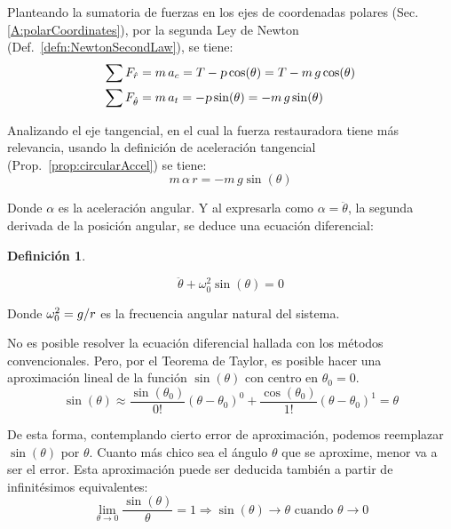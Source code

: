 \documentclass[a5paper,12pt,twoside]{book}
\newtheorem{defn}{{Definición}}[chapter]
\begin{document}
\begin{center}
    \def\svgwidth{\linewidth}
    
\end{center}

Planteando la sumatoria de fuerzas en los ejes de coordenadas polares (Sec. \ref{A:polarCoordinates}), por la segunda Ley de Newton (Def.\ \ref{defn:NewtonSecondLaw}), se tiene:
\begin{align*}
    \sum F_{\hat{r}} &= m \, a_c = T - \textsl{p} \cos(\theta) = T - m \, g \cos(\theta)
    \\
    \sum F_{\hat{\theta}} &= m \, a_t = - \textsl{p} \sin(\theta) = - m \, g \sin(\theta)
\end{align*}

Analizando el eje tangencial, en el cual la fuerza restauradora tiene más relevancia, usando la definición de aceleración tangencial (Prop.\ \ref{prop:circularAccel}) se tiene:
\[ m \, \alpha \, r = - m \, g \sin(\theta) \]

Donde $\alpha$ es la aceleración angular. Y al expresarla como $\alpha = \ddot{\theta}$, la segunda derivada de la posición angular, se deduce una ecuación diferencial:

\begin{mdframed}[style=MyFrame1]
    \begin{defn}
    \end{defn}
    \begin{equation*}
        \ddot{\theta} + \omega_0^2 \sin(\theta) = 0
    \end{equation*}
\end{mdframed}

Donde $\omega_0^2=g/r$ es la frecuencia angular natural del sistema.

No es posible resolver la ecuación diferencial hallada con los métodos convencionales. Pero, por el Teorema de Taylor, es posible hacer una aproximación lineal de la función $\sin{(\theta)}$ con centro en $\theta_0 = 0$.
\[
  \sin(\theta) \approx \frac{\sin(\theta_0)}{0!} \left( \theta-\theta_0 \right)^0 + \frac{\cos(\theta_0)}{1!} \left( \theta-\theta_0 \right)^1 = \theta
\]

De esta forma, contemplando cierto error de aproximación, podemos reemplazar $\sin{(\theta)}$ por $\theta$. Cuanto más chico sea el ángulo $\theta$ que se aproxime, menor va a ser el error. Esta aproximación puede ser deducida también a partir de infinitésimos equivalentes:
\[
  \lim_{\theta \to 0} \frac{\sin(\theta)}{\theta} = 1 \Rightarrow \sin(\theta) \to \theta \text{ cuando } \theta \to 0
\]
\end{document}
